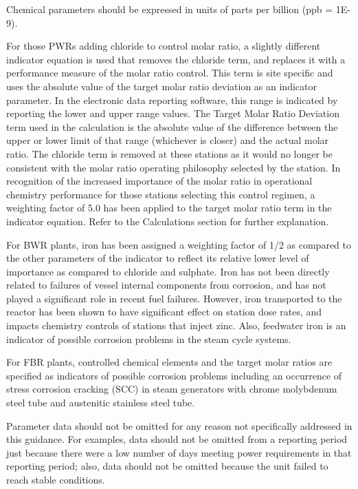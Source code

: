 Chemical parameters should be expressed in units of parts per billion
(ppb = 1E-9).

For those PWRs adding chloride to control molar ratio, a slightly
different indicator equation is used that removes the chloride term,
and replaces it with a performance measure of the molar ratio
control. This term is site specific and uses the absolute value of the
target molar ratio deviation as an indicator parameter. In the
electronic data reporting software, this range is indicated by
reporting the lower and upper range values. The Target Molar Ratio
Deviation term used in the calculation is the absolute value of the
difference between the upper or lower limit of that range (whichever
is closer) and the actual molar ratio. The chloride term is removed at
these stations as it would no longer be consistent with the molar
ratio operating philosophy selected by the station. In recognition of
the increased importance of the molar ratio in operational chemistry
performance for those stations selecting this control regimen, a
weighting factor of 5.0 has been applied to the target molar ratio
term in the indicator equation. Refer to the Calculations section for
further explanation.

For BWR plants, iron has been assigned a weighting factor of 1/2 as
compared to the other parameters of the indicator to reflect its
relative lower level of importance as compared to chloride and
sulphate. Iron has not been directly related to failures of vessel
internal components from corrosion, and has not played a significant
role in recent fuel failures. However, iron transported to the reactor
has been shown to have significant effect on station dose rates, and
impacts chemistry controls of stations that inject zinc. Also,
feedwater iron is an indicator of possible corrosion problems in the
steam cycle systems.

For FBR plants, controlled chemical elements and the target molar
ratios are specified as indicators of possible corrosion problems
including an occurrence of stress corrosion cracking (SCC) in steam
generators with chrome molybdenum steel tube and austenitic stainless
steel tube.

Parameter data should not be omitted for any reason not specifically
addressed in this guidance. For examples, data should not be omitted
from a reporting period just because there were a low number of days
meeting power requirements in that reporting period; also, data should
not be omitted because the unit failed to reach stable conditions.

